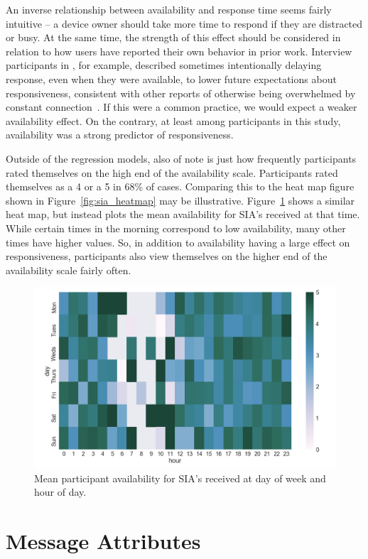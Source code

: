 \documentclass[12pt]{nuthesis}	%
\begin{document}
An inverse relationship between availability and response time seems fairly intuitive -- a device owner should take more time to respond if they are distracted or busy. At the same time, the strength of this effect should be considered in relation to how users have reported their own behavior in prior work. Interview participants in \citet{wohn2015ambient}, for example, described sometimes intentionally delaying response, even when they were available, to lower future expectations about responsiveness, consistent with other reports of otherwise being overwhelmed by constant connection~\citep[e.g.,][]{ames2013managing,hall2012calling}. If this were a common practice, we would expect a weaker availability effect. On the contrary, at least among participants in this study, availability was a strong predictor of responsiveness.

Outside of the regression models, also of note is just how frequently participants rated themselves on the high end of the availability scale. Participants rated themselves as a 4 or a 5 in 68\% of cases. Comparing this to the heat map figure shown in Figure~\ref{fig:sia_heatmap} may be illustrative. Figure~\ref{fig:sia_availability_heatmap} shows a similar heat map, but instead plots the mean availability for SIA's received at that time. While certain times in the morning correspond to low availability, many other times have higher values. So, in addition to availability having a large effect on responsiveness, participants also view themselves on the higher end of the availability scale fairly often.

\begin{figure}[h]
\centering
\includegraphics[width=.7\textwidth]{figures/sia_availability_heatmap}
\caption{Mean participant availability for SIA's received at day of week and hour of day.}
\label{fig:sia_availability_heatmap}
\end{figure}


\section{Message Attributes}
\end{document}
